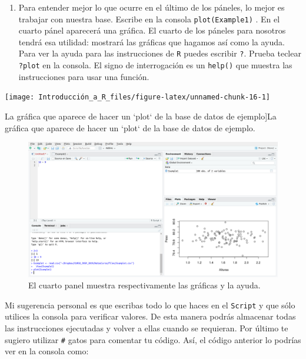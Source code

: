 \documentclass[]{tufte-book}
\providecommand{\tightlist}{%
  \setlength{\itemsep}{0pt}\setlength{\parskip}{0pt}}
\begin{document}
\begin{enumerate}
\def\labelenumi{\arabic{enumi}.}
\setcounter{enumi}{3}
\tightlist
\item
  Para entender mejor lo que ocurre en el último de los páneles, lo
  mejor es trabajar con nuestra base. Escribe en la consola
  \texttt{plot(Example1)} . En el cuarto pánel aparecerá una gráfica. El
  cuarto de los páneles para nosotros tendrá esa utilidad: mostrará las
  gráficas que hagamos así como la ayuda. Para ver la ayuda para las
  instrucciones de \texttt{R} puedes escribir \texttt{?}. Prueba teclear
  \texttt{?plot} en la consola. El signo de interrogación es un
  \texttt{help()} que muestra las instrucciones para usar una función.
\end{enumerate}

\begin{marginfigure}
\texttt{[image: Introducción\_a\_R\_files/figure-latex/unnamed-chunk-16-1]} \caption[La gráfica que aparece de hacer un `plot` de la base de datos de ejemplo]{La gráfica que aparece de hacer un `plot` de la base de datos de ejemplo.}\label{fig:unnamed-chunk-16}
\end{marginfigure}

\begin{figure}
\includegraphics[width=40in]{images/RStudio7} \caption[El cuarto panel muestra respectivamente las gráficas y la ayuda]{El cuarto panel muestra respectivamente las gráficas y la ayuda.}\label{fig:unnamed-chunk-17}
\end{figure}

Mi sugerencia personal es que escribas todo lo que haces en el
\texttt{Script} y que sólo utilices la consola para verificar valores.
De esta manera podrás almacenar todas las instrucciones ejecutadas y
volver a ellas cuando se requieran. Por último te sugiero utilizar
\texttt{\#} gatos para comentar tu código. Así, el código anterior lo
podrías ver en la consola como:
\end{document}
